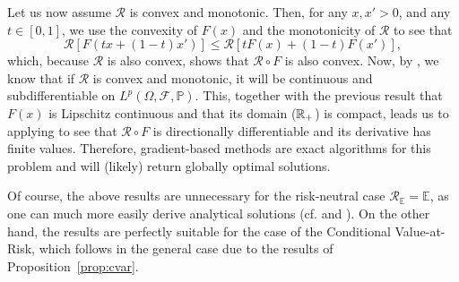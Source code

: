 \documentclass[12pt]{article}
\begin{document}
Let us now assume $\mathcal{R}$ is convex and monotonic.
Then, for any $x,x'>0$, and any $t\in [0,1]$, we use the convexity of $F(x)$ and the monotonicity of $\mathcal{R}$ to see that \[
    \mathcal{R}[F(tx + (1-t)x')] \le \mathcal{R}[tF(x) + (1-t)F(x')]
,\] which, because $\mathcal{R}$ is also convex, shows that $\mathcal{R} \circ F$ is also convex.
Now, by \citep[Proposition~6.5]{shapiroLecturesStochasticProgramming2009}, we know that if $\mathcal{R}$ is convex and monotonic, it will be continuous and subdifferentiable on $L^{p}\left( \Omega, \mathcal{F},\mathbb{P} \right)$.
This, together with the previous result that $F(x)$ is Lipschitz continuous and that its domain ($\mathbb{R}_+$) is compact, leads us to applying \citet[Theorem~6.10]{shapiroLecturesStochasticProgramming2009} to see that $\mathcal{R} \circ F$ is directionally differentiable and its derivative has finite values.
Therefore, gradient-based methods are exact algorithms for this problem and will (likely) return globally optimal solutions.

Of course, the above results are unnecessary for the risk-neutral case $\mathcal{R}_{\mathbb{E}}= \mathbb{E}$, as one can much more easily derive analytical solutions (cf. \citet[Chapter~1.e]{birgeIntroductionStochasticProgramming2011} and \citet[Chapter~1.2.1]{shapiroLecturesStochasticProgramming2009}).
On the other hand, the results are perfectly suitable for the case of the Conditional Value-at-Risk, which follows in the general case due to the results of Proposition~\ref{prop:cvar}.
\end{document}
